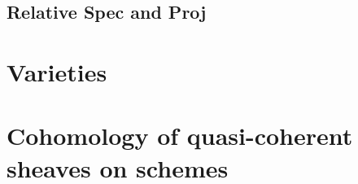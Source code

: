 


\subsection{Relative Spec and Proj}

























\section{Varieties}



\section{Cohomology of quasi-coherent sheaves on schemes}











